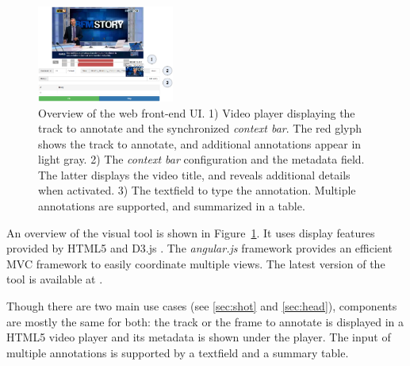 \documentclass[a4paper]{article}
\begin{document}
\begin{figure}[h]
	\centering
 	\includegraphics[width=0.4\textwidth]{camomile_ui-bis.png}
	\caption{Overview of the web front-end UI. 1) Video player displaying the track to annotate and the synchronized \emph{context bar}. The red glyph shows the track to annotate, and additional annotations appear in light gray. 2) The \emph{context bar} configuration and the metadata field. The latter displays the video title, and reveals additional details when activated. 3) The textfield to type the annotation. Multiple annotations are supported, and summarized in a table.} 
	\label{fig:frontend}

\end{figure}


An overview of the visual tool is shown in Figure~\ref{fig:frontend}. It uses display features provided by HTML5 and D3.js \cite{d3js}. The \textit{angular.js} framework \cite{angularjs} provides an efficient MVC framework to easily coordinate multiple views. The latest version of the tool is available at \cite{urlgithub}.



Though there are two main use cases (see \ref{sec:shot} and \ref{sec:head}), components are mostly the same for both: the track or the frame to annotate is displayed in a HTML5 video player and its metadata is shown under the player. The input of multiple annotations is supported by a textfield and a summary table. 



\end{document}
